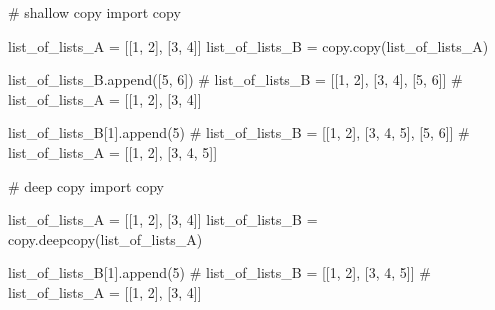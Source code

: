 \documentclass[
  letterpaper,
  DIV=11,
  numbers=noendperiod]{scrreprt}
\newenvironment{Shaded}{\begin{snugshade}}{\end{snugshade}}
\newcommand{\CommentTok}[1]{\textcolor[rgb]{0.37,0.37,0.37}{#1}}
\newcommand{\DecValTok}[1]{\textcolor[rgb]{0.68,0.00,0.00}{#1}}
\newcommand{\ImportTok}[1]{\textcolor[rgb]{0.00,0.46,0.62}{#1}}
\newcommand{\NormalTok}[1]{\textcolor[rgb]{0.00,0.23,0.31}{#1}}
\newcommand{\OperatorTok}[1]{\textcolor[rgb]{0.37,0.37,0.37}{#1}}
\begin{document}
\begin{Shaded}
\begin{Highlighting}[]
\CommentTok{\#  shallow copy}
\ImportTok{import}\NormalTok{ copy}

\NormalTok{list\_of\_lists\_A }\OperatorTok{=}\NormalTok{ [[}\DecValTok{1}\NormalTok{, }\DecValTok{2}\NormalTok{], [}\DecValTok{3}\NormalTok{, }\DecValTok{4}\NormalTok{]]}
\NormalTok{list\_of\_lists\_B }\OperatorTok{=}\NormalTok{ copy.copy(list\_of\_lists\_A)}

\NormalTok{list\_of\_lists\_B.append([}\DecValTok{5}\NormalTok{, }\DecValTok{6}\NormalTok{])}
\CommentTok{\# list\_of\_lists\_B = [[1, 2], [3, 4], [5, 6]]}
\CommentTok{\# list\_of\_lists\_A = [[1, 2], [3, 4]]}

\NormalTok{list\_of\_lists\_B[}\DecValTok{1}\NormalTok{].append(}\DecValTok{5}\NormalTok{)}
\CommentTok{\# list\_of\_lists\_B = [[1, 2], [3, 4, 5], [5, 6]]}
\CommentTok{\# list\_of\_lists\_A = [[1, 2], [3, 4, 5]]}
\end{Highlighting}
\end{Shaded}

\begin{Shaded}
\begin{Highlighting}[]
\CommentTok{\# deep copy}
\ImportTok{import}\NormalTok{ copy}

\NormalTok{list\_of\_lists\_A }\OperatorTok{=}\NormalTok{ [[}\DecValTok{1}\NormalTok{, }\DecValTok{2}\NormalTok{], [}\DecValTok{3}\NormalTok{, }\DecValTok{4}\NormalTok{]]}
\NormalTok{list\_of\_lists\_B }\OperatorTok{=}\NormalTok{ copy.deepcopy(list\_of\_lists\_A)}

\NormalTok{list\_of\_lists\_B[}\DecValTok{1}\NormalTok{].append(}\DecValTok{5}\NormalTok{)}
\CommentTok{\# list\_of\_lists\_B = [[1, 2], [3, 4, 5]]}
\CommentTok{\# list\_of\_lists\_A = [[1, 2], [3, 4]]}
\end{Highlighting}
\end{Shaded}
\end{document}
